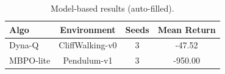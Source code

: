 \begin{table}[h]
\centering
\caption{Model-based results (auto-filled).}
\label{tab:modelresults}
\begin{tabular}{lccc}
\toprule
Algo & Environment & Seeds & Mean Return \\
\midrule
Dyna-Q & CliffWalking-v0 & 3 & -47.52 \\
MBPO-lite & Pendulum-v1 & 3 & -950.00 \\
\bottomrule
\end{tabular}
\end{table}

